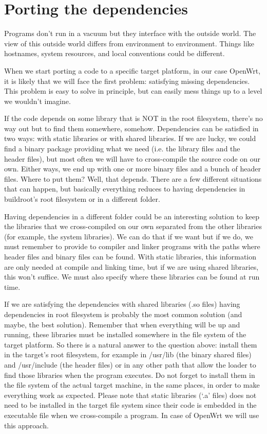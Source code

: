 \chapter{Porting the dependencies}\label{satisfy_dependencies}

Programs don’t run in a vacuum but they interface with the outside world.
The view of this outside world differs from environment to environment.
Things like hostnames, system resources, and local conventions could be different.

When we start porting a code to a specific target platform, in our case OpenWrt, it is likely that we will face the first problem: satisfying missing dependencies.
This problem is easy to solve in principle, but can easily mess things up to a level we wouldn’t imagine.

If the code depends on some library that is NOT in the root filesystem, there’s no way out but to find them somewhere, somehow.
Dependencies can be satisfied in two ways: with static libraries or with shared libraries.
If we are lucky, we could find a binary package providing what we need (i.e. the library files and the header files), but most often we will have to cross-compile the source code on our own.
Either ways, we end up with one or more binary files and a bunch of header files.
Where to put them? Well, that depends.
There are a few different situations that can happen, but basically everything reduces to having dependencies in buildroot's root filesystem or in a different folder.

Having dependencies in a different folder could be an interesting solution to keep the libraries that we cross-compiled on our own separated from the other libraries (for example, the system libraries).
We can do that if we want but if we do, we must remember to provide to compiler and linker programs with the paths where header files and binary files can be found.
With static libraries, this information are only needed at compile and linking time, but if we are using shared libraries, this won’t suffice.
We must also specify where these libraries can be found at run time.

If we are satisfying the dependencies with shared libraries (.so files) having dependencies in root filesystem is probably the most common solution (and maybe, the best solution).
Remember that when everything will be up and running, these libraries must be installed somewhere in the file system of the target platform.
So there is a natural answer to the question above: install them in the target's root filesystem, for example in /usr/lib (the binary shared files) and /usr/include (the header files) or in any other path that allow the loader to find those libraries when the program executes.
Do not forget to install them in the file system of the actual target machine, in the same places, in order to make everything work as expected.
Please note that static libraries (‘.a’ files) does not need to be installed in the target file system since their code is embedded in the executable file when we cross-compile a program.
In case of OpenWrt we will use this approach.




